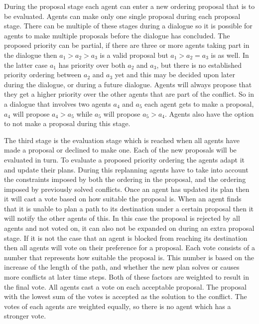 During the proposal stage each agent can enter a new ordering proposal that is
to be evaluated. Agents can make only one single proposal during each proposal
stage. There can be multiple of these stages during a dialogue so it is
possible for agents to make multiple proposals before the dialogue has
concluded. The proposed priority can be
partial, if there are three or more agents taking part in the dialogue then
$a_1 > a_2 > a_3$ is a valid proposal but $a_1 > a_2 = a_3$ is as well. In the
latter case $a_1$ has priority over both $a_2$ and $a_3$, but there is no
established priority ordering between $a_2$ and $a_3$ yet and this may be
decided upon later during the dialogue, or during a future dialogue. Agents
will always propose that they get a higher priority over the other agents that
are part of the conflict. So in a dialogue that involves two agents $a_4$ and
$a_5$ each agent gets to make a proposal, $a_4$ will propose $a_4 > a_5$ while
$a_5$ will propose $a_5 > a_4$. Agents also have the option to not make a 
proposal during this stage.

The third stage is the evaluation stage which is reached when all agents have
made a proposal or declined to make one. Each of the new proposals will be
evaluated in turn. To evaluate a proposed priority ordering the agents adapt it
and update their plans. During this replanning agents have to take into account
the constraints imposed by both the ordering in the proposal, and the ordering
imposed by previously solved conflicts. Once an agent has updated its plan then
it will cast a vote based on how suitable the proposal is. When an agent finds
that it is unable to plan a path to its destination under a certain proposal
then it will notify the other agents of this. In this case the proposal is
rejected by all agents and not voted on, it can also not be expanded on during
an extra proposal stage. If it is not the case that an agent is blocked from
reaching its destination then all agents will vote on their preference for a
proposal. Each vote consists of a number that represents how
suitable the proposal is. This number is based on the increase of the length of
the path, and whether the new plan solves or causes more conflicts at later
time steps. Both of these factors are weighted to result in the final vote. All
agents cast a vote on each acceptable proposal. The proposal with the lowest
sum of the votes is accepted as the solution to the conflict. The votes of each
agents are weighted equally, so there is no agent which has a stronger vote.


